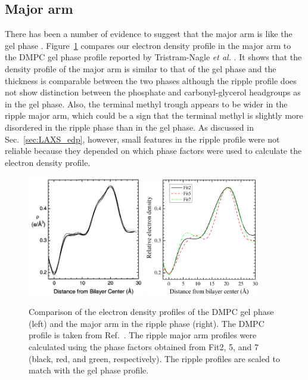 \subsection{Major arm}
There has been a number of evidence to suggest that the major arm is like 
the gel phase \cite{ref:Tardieu73,ref:Schneider83,ref:Sun96,ref:Riske09}. 
Figure~\ref{fig:gel_comparison} compares our electron density
profile in the major arm to the DMPC gel phase profile reported by 
Tristram-Nagle \textit{et al.} \cite{Tristram-Nagle02}. 
It shows that the density profile of the major arm is similar to that 
of the gel phase and the thickness is comparable between the two phases
although the ripple profile does not show distinction
between the phosphate and carbonyl-glycerol headgroups as in the gel phase.
Also, the terminal methyl trough appears to be wider in the ripple major arm,
which could be a sign that the terminal methyl is slightly more disordered
in the ripple phase than in the gel phase.
As discussed in
Sec.~\ref{sec:LAXS_edp}, however, small features in the ripple profile were not
reliable because they depended on which phase factors were used
to calculate the electron density profile.

\begin{figure}[htbp]
  \centering
  \includegraphics[width=0.45\textwidth]{figures/ripple/discussion/Tristram-Nagle_gel_DMPC}
  \includegraphics[width=0.45\textwidth]{figures/ripple/discussion/major_edp}
  \caption{Comparison of the electron density profiles of the DMPC gel phase (left)
  and the major arm in the ripple phase (right). The DMPC profile is taken from 
  Ref.~\cite{Tristram-Nagle02}. The ripple major arm profiles were calculated 
  using the phase factors obtained from Fit2, 5, and 7 (black, red, and green, respectively). 
  The ripple profiles are scaled to match 
  with the gel phase profile.}
  \label{fig:gel_comparison}
\end{figure}

